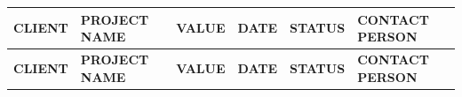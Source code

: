 \documentclass[a4paper,11pt]{article}
\begin{document}
{\color{awenDarkGrey}\scriptsize
\renewcommand{\arraystretch}{1.35}
\begin{longtable}{@{} p{2.8cm} p{4.6cm} p{1.6cm} C{1.0cm} p{1.6cm} p{3.4cm} @{}}
  \toprule
  \textcolor{awenWhite}{\bfseries CLIENT} & 
  \textcolor{awenWhite}{\bfseries PROJECT NAME} & 
  \textcolor{awenWhite}{\bfseries VALUE} & 
  \textcolor{awenWhite}{\bfseries DATE} &
  \textcolor{awenWhite}{\bfseries STATUS} &
  \textcolor{awenWhite}{\bfseries CONTACT PERSON} \\
  \midrule
  \endfirsthead

  \toprule
  \textcolor{awenWhite}{\bfseries CLIENT} & 
  \textcolor{awenWhite}{\bfseries PROJECT NAME} & 
  \textcolor{awenWhite}{\bfseries VALUE} & 
  \textcolor{awenWhite}{\bfseries DATE} &
  \textcolor{awenWhite}{\bfseries STATUS} &
  \textcolor{awenWhite}{\bfseries CONTACT PERSON} \\
  \midrule
  \endhead
  

\end{longtable}}
\end{document}
